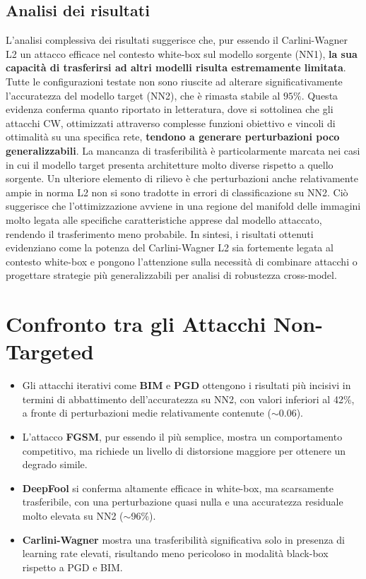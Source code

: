         \subsection{Analisi dei risultati}
            L’analisi complessiva dei risultati suggerisce che, pur essendo il Carlini-Wagner L2 un attacco efficace nel contesto white-box sul modello sorgente (NN1), \textbf{la sua capacità di trasferirsi ad altri modelli risulta estremamente limitata}. Tutte le configurazioni testate non sono riuscite ad alterare significativamente l’accuratezza del modello target (NN2), che è rimasta stabile al $95\%$.
            Questa evidenza conferma quanto riportato in letteratura, dove si sottolinea che gli attacchi CW, ottimizzati attraverso complesse funzioni obiettivo e vincoli di ottimalità su una specifica rete, \textbf{tendono a generare perturbazioni poco generalizzabili}. La mancanza di trasferibilità è particolarmente marcata nei casi in cui il modello target presenta architetture molto diverse rispetto a quello sorgente.
            Un ulteriore elemento di rilievo è che perturbazioni anche relativamente ampie in norma L2 non si sono tradotte in errori di classificazione su NN2. Ciò suggerisce che l’ottimizzazione avviene in una regione del manifold delle immagini molto legata alle specifiche caratteristiche apprese dal modello attaccato, rendendo il trasferimento meno probabile.
            In sintesi, i risultati ottenuti evidenziano come la potenza del Carlini-Wagner L2 sia fortemente legata al contesto white-box e pongono l’attenzione sulla necessità di combinare attacchi o progettare strategie più generalizzabili per analisi di robustezza cross-model.

    \section{Confronto tra gli Attacchi Non-Targeted}
        \begin{itemize}
          \item Gli attacchi iterativi come \textbf{BIM} e \textbf{PGD} ottengono i risultati più incisivi in termini di abbattimento dell’accuratezza su NN2, con valori inferiori al 42\%, a fronte di perturbazioni medie relativamente contenute ($\sim$0.06).
          
          \item L’attacco \textbf{FGSM}, pur essendo il più semplice, mostra un comportamento competitivo, ma richiede un livello di distorsione maggiore per ottenere un degrado simile.
          
          \item \textbf{DeepFool} si conferma altamente efficace in white-box, ma scarsamente trasferibile, con una perturbazione quasi nulla e una accuratezza residuale molto elevata su NN2 ($\sim$96\%).
          
          \item \textbf{Carlini-Wagner} mostra una trasferibilità significativa solo in presenza di learning rate elevati, risultando meno pericoloso in modalità black-box rispetto a PGD e BIM.
        \end{itemize}

